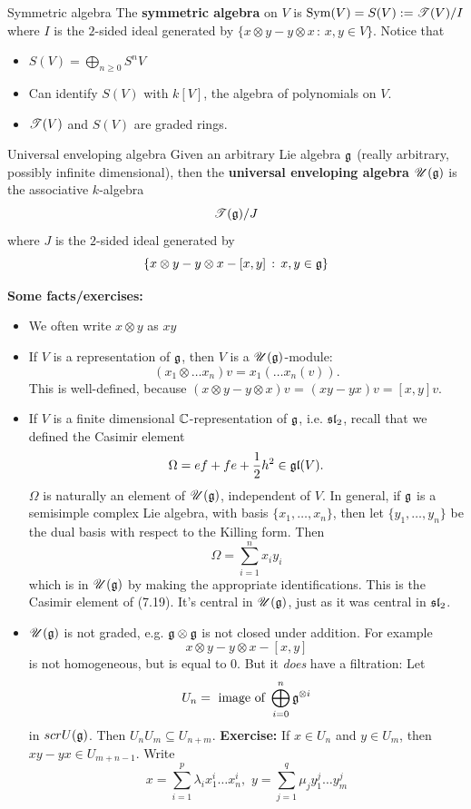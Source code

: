 \documentclass{article}
\begin{document}
\begin{fancydefine*}{Symmetric algebra}
    The \textbf{symmetric algebra} on $V$ is $\operatorname{Sym}(V) = S(V) := \mathscr{T}(V)/I$ where $I$ is the $2$-sided ideal generated by $\{x\otimes y - y \otimes x \, : \, x,y \in V\}$. Notice that \begin{itemize}
        \item $S(V) = \bigoplus_{n \geq 0} S^{n}V$
        \item Can identify $S(V)$ with $k[V]$, the algebra of polynomials on $V$.
        \item $\mathscr{T}(V)$ and $S(V)$ are graded rings.
    \end{itemize}
\end{fancydefine*}
\begin{fancydefine}{Universal enveloping algebra}
    Given an arbitrary Lie algebra $\mathfrak{g}$ (really arbitrary, possibly infinite dimensional), then the \textbf{universal enveloping algebra} $\mathscr{U}(\mathfrak{g})$ is the associative $k$-algebra \[ \mathscr{T}(\mathfrak{g})/J\] where $J$ is the $2$-sided ideal generated by \[ \{x\otimes y - y \otimes x - [x,y] \, : \, x,y \in \mathfrak{g}\}\]
\end{fancydefine}
\textbf{Some facts/exercises:} \begin{itemize}
    \item We often write $x \otimes y$ as $xy$
    \item If $V$ is a representation of $\mathfrak{g}$, then $V$ is a $\mathscr{U}(\mathfrak{g})$-module: \[ (x_{1} \otimes \dots x_{n})v = x_{1}(\dots x_{n}(v)).\] This is well-defined, because $(x \otimes y - y\otimes x)v$ = $(xy-yx)v = [x,y]v$.
    \item If $V$ is a finite dimensional $\mathbb{C}$-representation of $\mathfrak{g}$, i.e. $\mathfrak{sl}_{2}$, recall that we defined the Casimir element \[ \Omega = ef + fe + \frac{1}{2}h^{2} \in \mathfrak{gl}(V).\] $\Omega$ is naturally an element of $\mathscr{U}(\mathfrak{g})$, independent of $V$. In general, if $\mathfrak{g}$ is a semisimple complex Lie algebra, with basis $\{x_{1},\dots, x_{n}\}$, then let $\{y_{1},\dots,y_{n}\}$ be the dual basis with respect to the Killing form. Then \[\Omega = \sum_{i=1}^{n} x_{i}y_{i}\] which is in $\mathscr{U}(\mathfrak{g})$ by making the appropriate identifications. This is the Casimir element of (7.19). It's central in $\mathscr{U}(\mathfrak{g})$, just as it was central in $\mathfrak{sl}_{2}$.
    \item $\mathscr{U}(\mathfrak{g})$ is not graded, e.g. $\mathfrak{g} \otimes \mathfrak{g}$ is not closed under addition. For example \[
        x \otimes y - y \otimes x -[x,y]
        \] is not homogeneous, but is equal to $0$. But it \textit{does} have a filtration: Let \[ U_{n} = \text{ image of } \bigoplus_{i=0}^{n} \mathfrak{g}^{\otimes i}\] in $scrU(\mathfrak{g})$. Then $U_{n}U_{m}\subseteq U_{n+m}$. \gap \textbf{Exercise: }If $x \in U_{n}$ and $y \in U_{m}$, then $xy-yx \in U_{m+n-1}$. Write \[ x= \sum_{i=1}^{p}\lambda_{i}x_{1}^{i} \dots x_{n}^{i}, \, \, y=\sum_{j=1}^{q}\mu_{j}y_{1}^{j} \dots y_{m}^{j}\]
\end{itemize}
\end{document}
